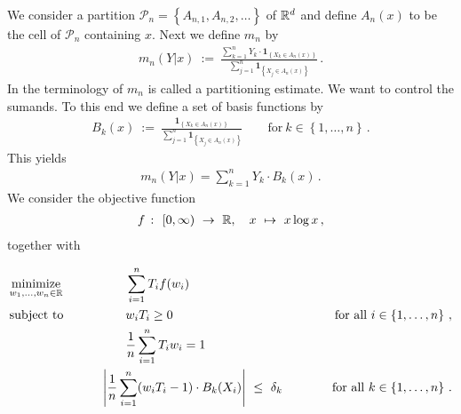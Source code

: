 We consider a partition
$
  \mathcal{P}_n
  =
  \left\{ 
    A_{n,1}
    ,
    A_{n,2}
    ,
    \ldots
  \right\}
$
of $ \mathbb{R}^d $
and define
$ A_n(x) $ to be the cell of $ \mathcal{P}_n $ containing $x$.
Next we define $ m_n $ by
\begin{gather}
  m_n(Y|x)
  \ 
  :=
  \ 
  \frac
  {
    \sum_{k=1}^{n} 
    Y_k
    \cdot
    \mathbf{1}
    _
    {
      \left\{ 
      X_k \in A_n(x)
      \right\}
    }
  }
  {
    \sum_{j=1}^{n} 
    \mathbf{1}
    _
    {
      \left\{ 
      X_j \in A_n(x)
      \right\}
    }
  }
  \,.
\end{gather}
In the terminology of \cite[§4]{Gyorfi2002}
$m_n$ is called a partitioning estimate.
We want to control the sumands.
To this end we define a set of basis functions by
\begin{gather}
  B_k(x)
  \ 
  :=
  \ 
  \frac
  {
    \mathbf{1}
    _
    {
      \left\{ 
      X_k \in A_n(x)
      \right\}
    }
  }
  {
    \sum_{j=1}^{n} 
    \mathbf{1}
    _
    {
      \left\{ 
      X_j \in A_n(x)
      \right\}
    }
  }
  \qquad
  \text{for}\ 
  k \in \left\{ 1,\ldots,n \right\}
  \,.
\end{gather}
This yields
\begin{gather}
  m_n(Y|x)
  =
  \sum_{k=1}^{n} 
  Y_k
  \cdot
  B_k(x)
  \,.
\end{gather}
We consider the objective function
\begin{gather}
  f
  \ 
  \colon
  \ 
  [0,\infty)
  \ 
  \to 
  \ 
  \R
  ,
  \quad
  x
  \ 
  \mapsto
  \ 
  x \log x\,,
\end{gather}
together with 
\begin{fproblem}
  \label{bw:1:primal}
\begin{align*}
    &\underset{w_1, \ldots, w_n \in \R}
    {\text{minimize}}
    &&\qquad\qquad
    \sum_{i = 1}^{n} 
    T_i
    f(w_i)
    &&&
    \\
    &\text{subject to}
    &&\qquad\qquad
    w_i T_i
    \ge
    0
    &&&
    \qquad
    \text{for all}\ 
    i \in \left\{ 1, \ldots, n \right\}
    \,,
    \\
    & 
    &&\qquad\qquad
    \frac{1}{n}
    \sum_{i=1}^{n} 
    T_i w_i
    =1
    \\
    & 
    &&\qquad
    \left| 
      \frac{1}{n} 
      \sum_{i = 1}^{n} 
      (
      w_i T_i 
      - 
      1
      )
      \cdot
      B_k(X_i)
    \right|
    \ 
    \le 
    \ 
    \delta_k
    &&&
    \qquad
    \text{for all}\ 
    k \in \left\{ 1, \ldots, n \right\}
    \,.
\end{align*}
\end{fproblem}
